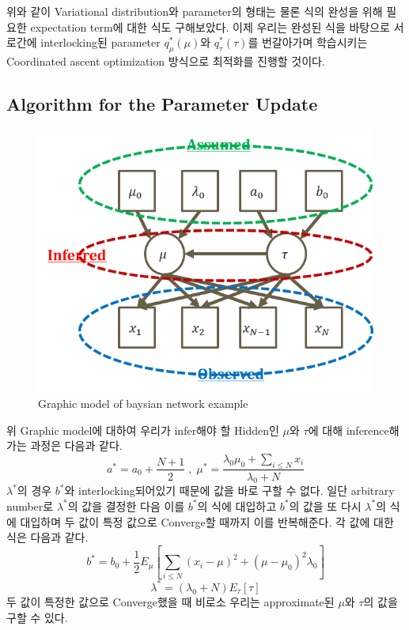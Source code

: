 \documentclass[draft=false]{oblivoir}
\begin{document}
위와 같이 Variational distribution와 parameter의 형태는 물론 식의 완성을 위해 필요한 expectation term에 대한 식도 구해보았다. 이제 우리는 완성된 식을 바탕으로 서로간에 interlocking된 parameter $q_{\mu}^*(\mu)$와 $q_{\tau}^{*}(\tau)$를 번갈아가며 학습시키는 Coordinated ascent optimization 방식으로 최적화를 진행할 것이다. 
\subsection{Algorithm for the Parameter Update}
\begin{figure}[ht] \centering 
\includegraphics[scale=0.6]{fig11_8.png} 
\caption{Graphic model of baysian network example}
\label{fig:11-8}
\end{figure}
위 Graphic model에 대하여 우리가 infer해야 할 Hidden인 $\mu$와 $\tau$에 대해 inference해가는 과정은 다음과 같다. 
\begin{equation}
a^{*}=a_{0}+\frac{N+1}{2}\;,\; \mu^*=\frac{\lambda_{0}\mu_{0}+\sum_{i \leq N}x_{i}}{\lambda_{0}+N}
\label{eq:11-2-11-9}
\end{equation}
$\lambda^*$의 경우 $b^{*}$와 interlocking되어있기 때문에 값을 바로 구할 수 없다. 일단 arbitrary number로 $\lambda^*$의 값을 결정한 다음 이를 $b^{*}$의 식에 대입하고 $b^{*}$의 값을 또 다시 $\lambda^*$의 식에 대입하며 두 값이 특정 값으로 Converge할 때까지 이를 반복해준다. 각 값에 대한 식은 다음과 같다. 
\begin{equation}
b^{*}=b_{0}+\frac{1}{2}E_{\mu}\left[\sum_{i \leq N}(x_{i}-\mu)^2+(\mu-\mu_{0})^2\lambda_{0}\right]
\label{eq:11-2-11-10}
\end{equation}
\begin{equation}
\lambda^{*}=(\lambda_{0}+N)E_{\tau}[\tau]
\label{eq:11-2-11-11}
\end{equation}
두 값이 특정한 값으로 Converge했을 때 비로소 우리는 approximate된 $\mu$와 $\tau$의 값을 구할 수 있다.
\end{document}
